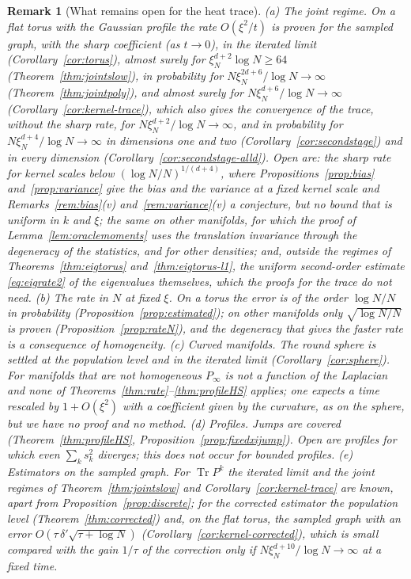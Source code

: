 \documentclass[11pt,a4paper]{article}
\theoremstyle{stmt}
\theoremstyle{defn}
\theoremstyle{rmk}
\newtheorem{remark}[theorem]{Remark}
\numberwithin{equation}{section}
\DeclareMathOperator{\Tr}{Tr}
\begin{document}
{\begin{remark}[What remains open for the heat trace]\label{rem:rateopen}
(a) \emph{The joint regime.} On a flat torus with the Gaussian profile the rate $O(\xi^2/t)$ is proven for the sampled graph, with the sharp coefficient (as $t\to0$), in the iterated limit (Corollary~\ref{cor:torus}), almost surely for $\xi_N^{d+2}\log N\ge64$ (Theorem~\ref{thm:jointslow}), in probability for $N\xi_N^{2d+6}/\log N\to\infty$ (Theorem~\ref{thm:jointpoly}), and almost surely for $N\xi_N^{d+6}/\log N\to\infty$ (Corollary~\ref{cor:kernel-trace}), which also gives the convergence of the trace, without the sharp rate, for $N\xi_N^{d+2}/\log N\to\infty$, and in probability for $N\xi_N^{d+4}/\log N\to\infty$ in dimensions one and two (Corollary~\ref{cor:secondstage}) and in every dimension (Corollary~\ref{cor:secondstage-alld}). Open are: the sharp rate for kernel scales below $(\log N/N)^{1/(d+4)}$, where Propositions~\ref{prop:bias} and~\ref{prop:variance} give the bias and the variance at a fixed kernel scale and Remarks~\ref{rem:bias}(v) and~\ref{rem:variance}(v) a conjecture, but no bound that is uniform in $k$ and $\xi$; the same on other manifolds, for which the proof of Lemma~\ref{lem:oraclemoments} uses the translation invariance through the degeneracy of the statistics, and for other densities; and, outside the regimes of Theorems~\ref{thm:eigtorus} and~\ref{thm:eigtorus-l1}, the uniform second-order estimate \eqref{eq:eigrate2} of the eigenvalues themselves, which the proofs for the trace do not need.
(b) \emph{The rate in $N$ at fixed $\xi$.} On a torus the error is of the order $\log N/N$ in probability (Proposition~\ref{prop:estimated}); on other manifolds only $\sqrt{\log N/N}$ is proven (Proposition~\ref{prop:rateN}), and the degeneracy that gives the faster rate is a consequence of homogeneity.
(c) \emph{Curved manifolds.} The round sphere is settled at the population level and in the iterated limit (Corollary~\ref{cor:sphere}). For manifolds that are not homogeneous $P_\infty$ is not a function of the Laplacian and none of Theorems~\ref{thm:rate}--\ref{thm:profileHS} applies; one expects a time rescaled by $1+O(\xi^2)$ with a coefficient given by the curvature, as on the sphere, but we have no proof and no method.
(d) \emph{Profiles.} Jumps are covered (Theorem~\ref{thm:profileHS}, Proposition~\ref{prop:fixedxijump}). Open are profiles for which even $\sum_ks_k^2$ diverges; this does not occur for bounded profiles.
(e) \emph{Estimators on the sampled graph.} For $\Tr P^k$ the iterated limit and the joint regimes of Theorem~\ref{thm:jointslow} and Corollary~\ref{cor:kernel-trace} are known, apart from Proposition~\ref{prop:discrete}; for the corrected estimator the population level (Theorem~\ref{thm:corrected}) and, on the flat torus, the sampled graph with an error $O(\tau\,\delta'\sqrt{\tau+\log N})$ (Corollary~\ref{cor:kernel-corrected}), which is small compared with the gain $1/\tau$ of the correction only if $N\xi_N^{d+10}/\log N\to\infty$ at a fixed time.
\end{remark}

}
\end{document}
